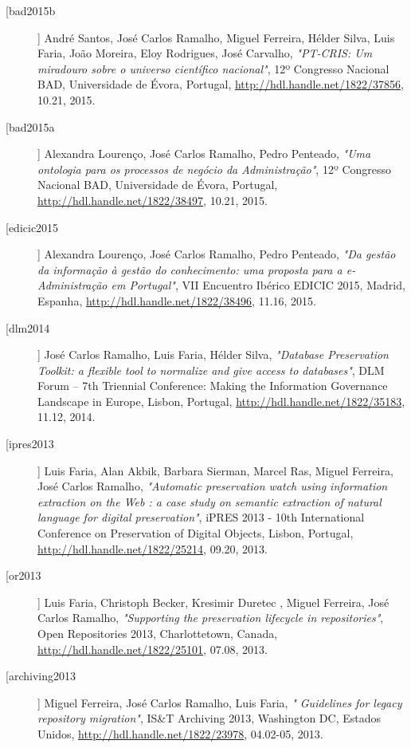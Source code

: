 \begin{description}
\item[[bad2015b]]
    \textsf{André Santos, José Carlos Ramalho, Miguel Ferreira, Hélder Silva, Luis Faria, João Moreira, Eloy Rodrigues, José Carvalho}, \emph{"PT-CRIS: Um miradouro sobre o universo científico nacional"}, 12º Congresso Nacional BAD, Universidade de Évora, Portugal, \url{http://hdl.handle.net/1822/37856}, 10.21, 2015.

\item[[bad2015a]]
    \textsf{Alexandra Lourenço, José Carlos Ramalho, Pedro Penteado}, \emph{"Uma ontologia para os processos de negócio da Administração"}, 12º Congresso Nacional BAD, Universidade de Évora, Portugal, \url{http://hdl.handle.net/1822/38497}, 10.21, 2015.

\item[[edicic2015]]
    \textsf{Alexandra Lourenço, José Carlos Ramalho, Pedro Penteado}, \emph{"Da gestão da informação à gestão do conhecimento: uma proposta para a e-Administração em Portugal"}, VII Encuentro Ibérico EDICIC 2015, Madrid, Espanha, \url{http://hdl.handle.net/1822/38496}, 11.16, 2015.

\item[[dlm2014]]
    \textsf{José Carlos Ramalho, Luis Faria, Hélder Silva}, \emph{"Database Preservation Toolkit: a flexible tool to normalize and give access to databases"}, DLM Forum – 7th Triennial Conference: Making the Information Governance Landscape in Europe, Lisbon, Portugal, \url{http://hdl.handle.net/1822/35183}, 11.12, 2014.


\item[[ipres2013]]
    \textsf{Luis Faria, Alan Akbik, Barbara Sierman, Marcel Ras, Miguel Ferreira, José Carlos Ramalho}, \emph{"Automatic preservation watch using information extraction on the Web : a case study on semantic extraction of natural language for digital preservation"}, iPRES 2013 - 10th International Conference on Preservation of Digital Objects, Lisbon, Portugal, \url{http://hdl.handle.net/1822/25214}, 09.20, 2013.

\item[[or2013]]
    \textsf{Luis Faria, Christoph Becker, Kresimir Duretec , Miguel Ferreira, José Carlos Ramalho}, \emph{"Supporting the preservation lifecycle in repositories"}, Open Repositories 2013, Charlottetown, Canada, \url{ http://hdl.handle.net/1822/25101}, 07.08, 2013.

\item[[archiving2013]]
    \textsf{Miguel Ferreira, José Carlos Ramalho, Luis Faria}, \emph{"	Guidelines for legacy repository migration"}, IS&T Archiving 2013, Washington DC, Estados Unidos, \url{http://hdl.handle.net/1822/23978}, 04.02-05, 2013.


\end{description}
